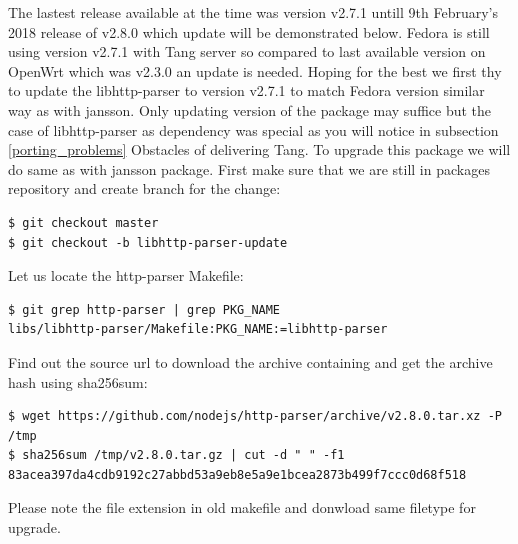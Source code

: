 The lastest release available at the time was version v2.7.1 untill 9th February's 2018 release of v2.8.0 which update will be demonstrated below.
Fedora is still using version v2.7.1 with Tang server so compared to last available version on OpenWrt which was v2.3.0 an update is needed.
Hoping for the best we first thy to update the libhttp-parser to version v2.7.1 to match Fedora version similar way as with jansson.
Only updating version of the package may suffice but the case of libhttp-parser as dependency was special as you will notice in subsection \ref{porting_problems} Obstacles of delivering Tang.
To upgrade this package we will do same as with jansson package.
First make sure that we are still in packages repository and create branch for the change:
\begin{lstlisting}[columns=fixed,basicstyle=\ttfamily\footnotesize,tabsize=4,backgroundcolor=\color{yellow!10}]
$ git checkout master
$ git checkout -b libhttp-parser-update
\end{lstlisting}
Let us locate the http-parser Makefile:
\begin{lstlisting}[columns=fixed,basicstyle=\ttfamily\footnotesize,tabsize=4,backgroundcolor=\color{yellow!10}]
$ git grep http-parser | grep PKG_NAME
libs/libhttp-parser/Makefile:PKG_NAME:=libhttp-parser
\end{lstlisting}
Find out the source url to download the archive containing and get the archive hash using sha256sum:
\begin{lstlisting}[columns=fixed,basicstyle=\ttfamily\footnotesize,tabsize=4,backgroundcolor=\color{yellow!10}]
$ wget https://github.com/nodejs/http-parser/archive/v2.8.0.tar.xz -P /tmp
$ sha256sum /tmp/v2.8.0.tar.gz | cut -d " " -f1
83acea397da4cdb9192c27abbd53a9eb8e5a9e1bcea2873b499f7ccc0d68f518
\end{lstlisting}
Please note the file extension in old makefile and donwload same filetype for upgrade.

